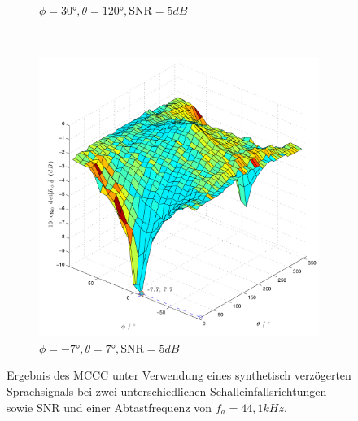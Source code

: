 \begin{figure}
\begin{subfigure}[b]{0.48\textwidth}
                \caption{$\phi=30°,\theta=120°, \mathrm{SNR}=5dB$}
                \label{fig:Sim_Phi_30_Theta_120_dB_SNR_5dB}
        \end{subfigure}
        ~ %
        \begin{subfigure}[b]{0.48\textwidth}
                \centering
                \includegraphics[width=\textwidth]{images/02_Konzeptionierung/Sim_voice_Phi_-7_Theta_7_SNR_5dB_log}
                \caption{$\phi=-7°,\theta=7°, \mathrm{SNR}=5dB$}
                \label{fig:Sim_Phi_-7_Theta_7_dB_SNR_5dB}
        \end{subfigure}
        \caption{Ergebnis des MCCC unter Verwendung eines synthetisch verzögerten Sprachsignals bei zwei unterschiedlichen Schalleinfallsrichtungen sowie SNR und einer Abtastfrequenz von $f_a=44,1kHz$.}
        \label{fig:Sim_Synthetic_dB}
\end{figure}
         
